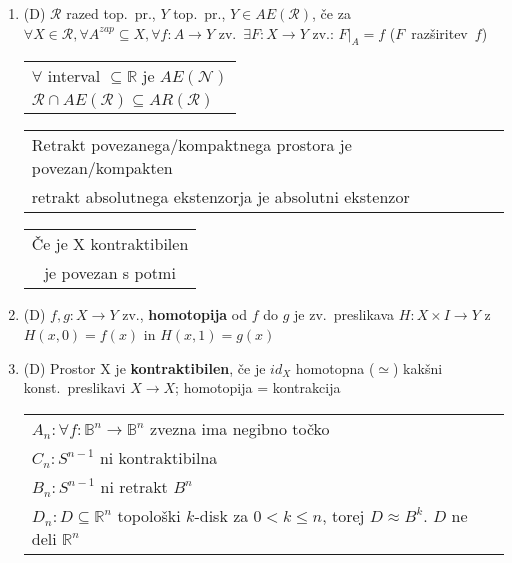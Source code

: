 \documentclass[10pt,a4paper]{article}
\begin{document}
\begin{enumerate}
\item (D) $\mathcal{R}$ razed top.~pr., $Y$ top.~pr., $Y \in AE(\mathcal{R})$, če za $\forall X \in \mathcal{R}, \forall A^{zap} \subseteq X, \forall f: A \rightarrow Y$ zv.\ $\exists F: X \rightarrow Y$ zv.: $F|_A = f$ ($F$~razširitev~$f$)

\vspace{-4mm}
\begin{table}[htbp]
    \centering
    \begin{tabular}{|l|}
        \hline
        \(\forall\) interval $\subseteq \mathbb{R}$ je $AE(\mathcal{N})$ \\
        $\mathcal{R} \cap AE(\mathcal{R}) \subseteq AR(\mathcal{R})$ \\
        \hline
    \end{tabular}
    \begin{tabular}{l}
        Retrakt povezanega/kompaktnega prostora je povezan/kompakten \\ 
        retrakt absolutnega ekstenzorja je absolutni ekstenzor \\
    \end{tabular}
    \begin{tabular}{|c|}
        \hline
        Če je X kontraktibilen \\
        je povezan s potmi \\
        \hline
    \end{tabular}
\end{table}
\vspace{-4mm}

    
\item (D) $f,g: X \rightarrow Y$ zv., \textbf{homotopija} od $f$ do $g$ je zv.~preslikava $H: X \times I \rightarrow Y$ z $H(x, 0) = f(x)$ in $H(x, 1) = g(x)$
    
\item (D) Prostor X je \textbf{kontraktibilen}, če je $id_X$ homotopna ($\simeq$) kakšni konst.~preslikavi $X \rightarrow X$; homotopija = kontrakcija
    

\vspace{1mm}
    \begin{tabular}{|l|}
        \hline
        $A_n:\forall f : \mathbb{B}^n \rightarrow \mathbb{B}^n$ zvezna ima negibno točko \\
        $C_n: S^{n-1}$ ni kontraktibilna \\
        $B_n: S^{n-1}$ ni retrakt $B^n$ \\
        $D_n: D \subseteq \mathbb{R}^n$  topološki $k$-disk za $0 < k \leq n$, torej $D \approx B^k$. $D$ ne deli $\mathbb{R}^n$ \\    
        \hline
    \end{tabular}



\end{enumerate}
\end{document}

